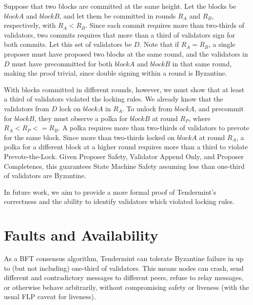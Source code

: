 Suppose that two blocks are committed at the same height.
Let the blocks be $blockA$ and $blockB$, and let them be committed in rounds $R_A$ and $R_B$, respectively, with $R_A < R_B$.
Since each commit requires more than two-thirds of validators, 
two commits requires that more than a third of validators sign for both commits.
Let this set of validators be $D$.
Note that if $R_A = R_B$, a single proposer must have proposed two blocks at the same round, 
and the validators in $D$ must have precommitted for both $blockA$ and $blockB$ in that same round, 
making the proof trivial, since double signing within a round is Byzantine.

With blocks committed in different rounds, however, 
we must show that at least a third of validators violated the locking rules.
We already know that the validators from $D$ lock on $blockA$ in $R_A$.
To unlock from $blockA$, and precommit for $blockB$, 
they must observe a polka for $blockB$ at round $R_P$, where $R_A < R_P <= R_B$.
A polka requires more than two-thirds of validators to prevote for the same block.
Since more than two-thirds locked on $blockA$ at round $R_A$, 
a polka for a different block at a higher round requires more than a third to violate Prevote-the-Lock.
Given Proposer Safety, Validator Append Only, and Proposer Completenes,
this guarantees State Machine Safety assuming less than one-third of validators are Byzantine.

In future work, we aim to provide a more formal proof of Tendermint's correctness 
and the ability to identify validators which violated locking rules.


%
%
%


\section{Faults and Availability}

As a BFT consensus algorithm, Tendermint can tolerate Byzantine failure in up to (but not including) one-third of validators.
This means nodes can crash, send different and contradictory messages to different peers, refuse to relay messages, or otherwise behave arbitrarily,
without compromising safety or liveness (with the usual FLP caveat for liveness).

